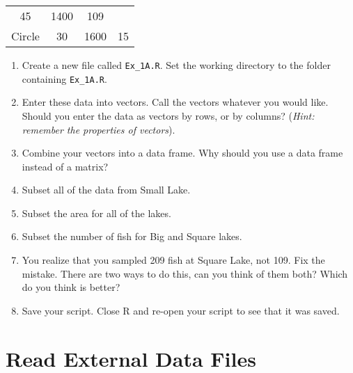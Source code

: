 \documentclass[]{book}
\theoremstyle{definition}
\theoremstyle{definition}
\theoremstyle{definition}
\theoremstyle{remark}
\begin{document}
\begin{longtable}[]{@{}cccc@{}}
\begin{minipage}[t]{0.09\columnwidth}
45\strut
\end{minipage} & \begin{minipage}[t]{0.09\columnwidth}\centering\strut
1400\strut
\end{minipage} & \begin{minipage}[t]{0.09\columnwidth}\centering\strut
109\strut
\end{minipage}\tabularnewline
\begin{minipage}[t]{0.11\columnwidth}\centering\strut
Circle\strut
\end{minipage} & \begin{minipage}[t]{0.09\columnwidth}\centering\strut
30\strut
\end{minipage} & \begin{minipage}[t]{0.09\columnwidth}\centering\strut
1600\strut
\end{minipage} & \begin{minipage}[t]{0.09\columnwidth}\centering\strut
15\strut
\end{minipage}\tabularnewline
\bottomrule
\end{longtable}

\begin{enumerate}
\def\labelenumi{\arabic{enumi}.}
\item
  Create a new file called \texttt{Ex\_1A.R}. Set the working directory
  to the folder containing \texttt{Ex\_1A.R}.
\item
  Enter these data into vectors. Call the vectors whatever you would
  like. Should you enter the data as vectors by rows, or by columns?
  (\emph{Hint: remember the properties of vectors}).
\item
  Combine your vectors into a data frame. Why should you use a data
  frame instead of a matrix?
\item
  Subset all of the data from Small Lake.
\item
  Subset the area for all of the lakes.
\item
  Subset the number of fish for Big and Square lakes.
\item
  You realize that you sampled 209 fish at Square Lake, not 109. Fix the
  mistake. There are two ways to do this, can you think of them both?
  Which do you think is better?
\item
  Save your script. Close R and re-open your script to see that it was
  saved.
\end{enumerate}

\section{Read External Data Files}\label{read}
\end{document}
